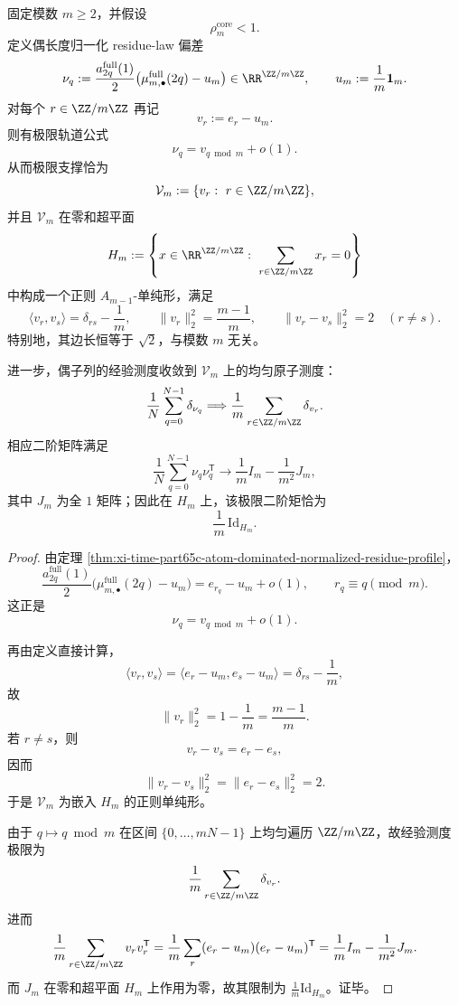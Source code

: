 \begin{theorem}\label{thm:conclusion-full-residue-regular-simplex-orbit}
固定模数 \(m\ge 2\)，并假设
\[
\rho_m^{\mathrm{core}}<1.
\]
定义偶长度归一化 residue-law 偏差
\[
\nu_q
:=
\frac{a_{2q}^{\mathrm{full}}(1)}{2}\bigl(\mu_{m,\bullet}^{\mathrm{full}}(2q)-u_m\bigr)
\in \RR^{\ZZ/m\ZZ},
\qquad
u_m:=\frac1m\mathbf 1_m.
\]
对每个 \(r\in \ZZ/m\ZZ\) 再记
\[
v_r:=e_r-u_m.
\]
则有极限轨道公式
\[
\nu_q=v_{q\bmod m}+o(1).
\]
从而极限支撑恰为
\[
\mathcal V_m:=\{v_r:\ r\in\ZZ/m\ZZ\},
\]
并且 \(\mathcal V_m\) 在零和超平面
\[
H_m:=\left\{x\in\RR^{\ZZ/m\ZZ}:\ \sum_{r\in\ZZ/m\ZZ}x_r=0\right\}
\]
中构成一个正则 \(A_{m-1}\)-单纯形，满足
\[
\langle v_r,v_s\rangle=\delta_{rs}-\frac1m,
\qquad
\|v_r\|_2^2=\frac{m-1}{m},
\qquad
\|v_r-v_s\|_2^2=2
\quad (r\neq s).
\]
特别地，其边长恒等于 \(\sqrt2\)，与模数 \(m\) 无关。

进一步，偶子列的经验测度收敛到 \(\mathcal V_m\) 上的均匀原子测度：
\[
\frac1N\sum_{q=0}^{N-1}\delta_{\nu_q}
\Longrightarrow
\frac1m\sum_{r\in\ZZ/m\ZZ}\delta_{v_r}.
\]
相应二阶矩阵满足
\[
\frac1N\sum_{q=0}^{N-1}\nu_q\nu_q^{\mathsf T}
\longrightarrow
\frac1m I_m-\frac1{m^2}J_m,
\]
其中 \(J_m\) 为全 \(1\) 矩阵；因此在 \(H_m\) 上，该极限二阶矩恰为
\[
\frac1m\,\mathrm{Id}_{H_m}.
\]
\end{theorem}
\begin{proof}
由定理 \ref{thm:xi-time-part65c-atom-dominated-normalized-residue-profile}，
\[
\frac{a_{2q}^{\mathrm{full}}(1)}{2}\bigl(\mu_{m,\bullet}^{\mathrm{full}}(2q)-u_m\bigr)
=
e_{r_q}-u_m+o(1),
\qquad
r_q\equiv q\pmod m.
\]
这正是
\[
\nu_q=v_{q\bmod m}+o(1).
\]

再由定义直接计算，
\[
\langle v_r,v_s\rangle
=
\langle e_r-u_m,e_s-u_m\rangle
=
\delta_{rs}-\frac1m,
\]
故
\[
\|v_r\|_2^2=1-\frac1m=\frac{m-1}{m}.
\]
若 \(r\neq s\)，则
\[
v_r-v_s=e_r-e_s,
\]
因而
\[
\|v_r-v_s\|_2^2=\|e_r-e_s\|_2^2=2.
\]
于是 \(\mathcal V_m\) 为嵌入 \(H_m\) 的正则单纯形。

由于 \(q\mapsto q\bmod m\) 在区间 \(\{0,\dots,mN-1\}\) 上均匀遍历 \(\ZZ/m\ZZ\)，故经验测度极限为
\[
\frac1m\sum_{r\in\ZZ/m\ZZ}\delta_{v_r}.
\]
进而
\[
\frac1m\sum_{r\in\ZZ/m\ZZ}v_rv_r^{\mathsf T}
=
\frac1m\sum_{r}(e_r-u_m)(e_r-u_m)^{\mathsf T}
=
\frac1m I_m-\frac1{m^2}J_m.
\]
而 \(J_m\) 在零和超平面 \(H_m\) 上作用为零，故其限制为 \(\frac1m\mathrm{Id}_{H_m}\)。证毕。
\end{proof}

